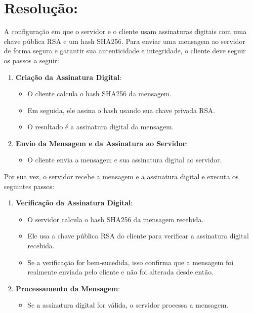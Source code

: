 \documentclass[a4paper,12pt]{article}
\begin{document}
\section*{Resolu\c{c}\~ao:}

A configuração em que o servidor e o cliente usam assinaturas digitais com uma chave 
pública RSA e um hash SHA256. Para enviar uma mensagem ao servidor de forma segura e garantir sua autenticidade e 
integridade, o cliente deve seguir os passos a seguir:

\begin{enumerate}
\item \textbf{Criação da Assinatura Digital}:
\begin{itemize}
    \item O cliente calcula o hash SHA256 da mensagem.
    \item Em seguida, ele assina o hash usando sua chave privada RSA.
    \item O resultado é a assinatura digital da mensagem.
\end{itemize}

\item \textbf{Envio da Mensagem e da Assinatura ao Servidor}:
\begin{itemize}
    \item O cliente envia a mensagem e sua assinatura digital ao servidor.
\end{itemize}
\end{enumerate}

Por sua vez, o servidor recebe a mensagem e a assinatura digital e executa 
os seguintes passos:

\begin{enumerate}
    \item \textbf{Verificação da Assinatura Digital}:
    \begin{itemize}
        \item O servidor calcula o hash SHA256 da mensagem recebida.
        \item Ele usa a chave pública RSA do cliente para verificar a assinatura digital recebida.
        \item Se a verificação for bem-sucedida, isso confirma que a mensagem foi realmente enviada 
        pelo cliente e não foi alterada desde então.
    \end{itemize}
    
    \item \textbf{Processamento da Mensagem}:
    \begin{itemize}
        \item Se a assinatura digital for válida, o servidor processa a mensagem.
    \end{itemize}
    \end{enumerate}
\end{document}
